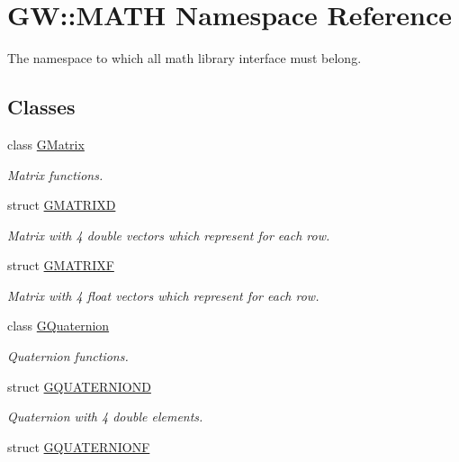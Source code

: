 \hypertarget{namespace_g_w_1_1_m_a_t_h}{}\section{GW\+:\+:M\+A\+TH Namespace Reference}
\label{namespace_g_w_1_1_m_a_t_h}


The namespace to which all math library interface must belong.  


\subsection*{Classes}
\begin{DoxyCompactItemize}
\item 
class \mbox{\hyperlink{class_g_w_1_1_m_a_t_h_1_1_g_matrix}{G\+Matrix}}
\begin{DoxyCompactList}\small\item\em Matrix functions. \end{DoxyCompactList}\item 
struct \mbox{\hyperlink{struct_g_w_1_1_m_a_t_h_1_1_g_m_a_t_r_i_x_d}{G\+M\+A\+T\+R\+I\+XD}}
\begin{DoxyCompactList}\small\item\em Matrix with 4 double vectors which represent for each row. \end{DoxyCompactList}\item 
struct \mbox{\hyperlink{struct_g_w_1_1_m_a_t_h_1_1_g_m_a_t_r_i_x_f}{G\+M\+A\+T\+R\+I\+XF}}
\begin{DoxyCompactList}\small\item\em Matrix with 4 float vectors which represent for each row. \end{DoxyCompactList}\item 
class \mbox{\hyperlink{class_g_w_1_1_m_a_t_h_1_1_g_quaternion}{G\+Quaternion}}
\begin{DoxyCompactList}\small\item\em Quaternion functions. \end{DoxyCompactList}\item 
struct \mbox{\hyperlink{struct_g_w_1_1_m_a_t_h_1_1_g_q_u_a_t_e_r_n_i_o_n_d}{G\+Q\+U\+A\+T\+E\+R\+N\+I\+O\+ND}}
\begin{DoxyCompactList}\small\item\em Quaternion with 4 double elements. \end{DoxyCompactList}\item 
struct \mbox{\hyperlink{struct_g_w_1_1_m_a_t_h_1_1_g_q_u_a_t_e_r_n_i_o_n_f}{G\+Q\+U\+A\+T\+E\+R\+N\+I\+O\+NF}}

\end{DoxyCompactItemize}
